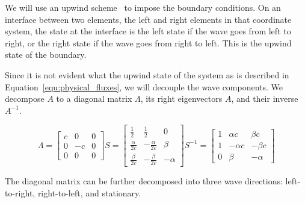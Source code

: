 We will use an upwind scheme~\cite{Toro2009} to impose the boundary conditions. On an interface
between two elements, the left and right elements in that coordinate system, the state at the
interface is the left state if the wave goes from left to right, or the right state if the wave goes
from right to left. This is the upwind state of the boundary.

Since it is not evident what the upwind state of the system as is described in
Equation~\ref{equ:physical_fluxes}, we will decouple the wave components. We decompose $A$ to a
diagonal matrix $\Lambda$, its right eigenvectors $A$, and their inverse $A^{-1}$.

\begin{equation}
    \Lambda = 
    \begin{bmatrix}
        c & 0 & 0 \\ 
        0 & -c & 0 \\ 
        0 & 0 & 0
    \end{bmatrix}
    S = 
    \begin{bmatrix}
        \frac{1}{2} & \frac{1}{2} & 0 \\ 
        \frac{\alpha}{2 c} & -\frac{\alpha}{2 c} & \beta \\ 
        \frac{\beta}{2 c} & -\frac{\beta}{2 c} & -\alpha 
    \end{bmatrix}
    S^{-1} = 
    \begin{bmatrix}
        1 & \alpha c & \beta c \\ 
        1 & -\alpha c & -\beta c \\ 
        0 & \beta & -\alpha
    \end{bmatrix}
\end{equation}

The diagonal matrix can be further decomposed into three wave directions: left-to-right,
right-to-left, and stationary.

